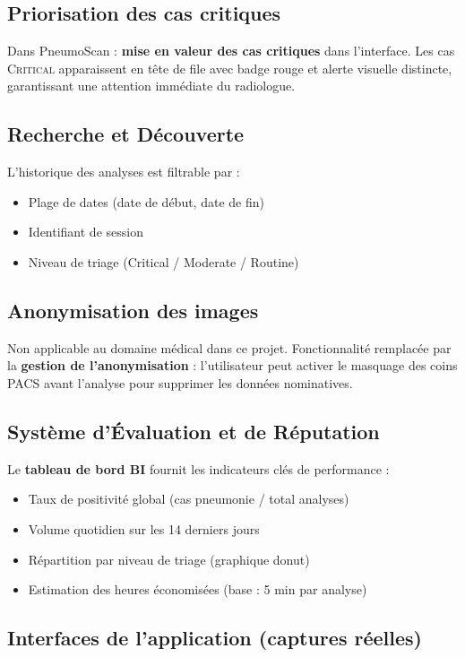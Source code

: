 \documentclass[12pt, a4paper]{report}
\begin{document}
\subsection{Priorisation des cas critiques}

Dans PneumoScan : \textbf{mise en valeur des cas critiques} dans l'interface.
Les cas \textsc{Critical} apparaissent en tête de file avec badge rouge et alerte
visuelle distincte, garantissant une attention immédiate du radiologue.

\subsection{Recherche et Découverte}

L'historique des analyses est filtrable par :
\begin{itemize}
  \item Plage de dates (date de début, date de fin)
  \item Identifiant de session
  \item Niveau de triage (Critical / Moderate / Routine)
\end{itemize}

\subsection{Anonymisation des images}

Non applicable au domaine médical dans ce projet. Fonctionnalité remplacée par
la \textbf{gestion de l'anonymisation} : l'utilisateur peut activer le masquage
des coins PACS avant l'analyse pour supprimer les données nominatives.

\subsection{Système d'Évaluation et de Réputation}

Le \textbf{tableau de bord BI} fournit les indicateurs clés de performance :
\begin{itemize}
  \item Taux de positivité global (cas pneumonie / total analyses)
  \item Volume quotidien sur les 14 derniers jours
  \item Répartition par niveau de triage (graphique donut)
  \item Estimation des heures économisées (base : 5 min par analyse)
\end{itemize}
\newpage
\subsection{Interfaces de l'application (captures réelles)}
\end{document}

